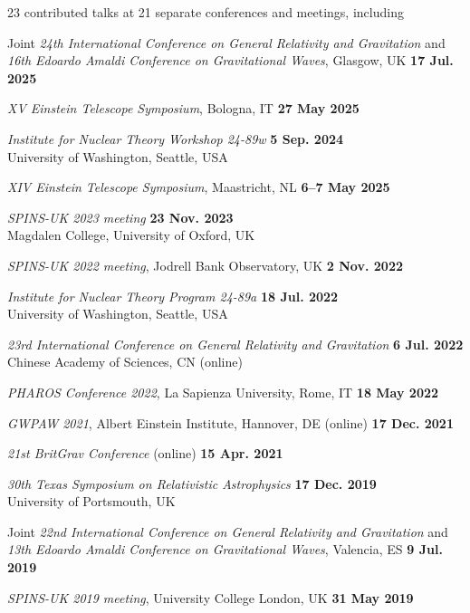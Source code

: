23 contributed talks at 21 separate conferences and meetings, including

\begin{etaremune}
    \item Joint \textit{24th International Conference on General Relativity and
    Gravitation} and
    \textit{16th Edoardo Amaldi Conference on Gravitational Waves}, Glasgow, UK
    \hfill \textbf{17 Jul. 2025}
    \item \textit{XV Einstein Telescope Symposium}, Bologna, IT
    \hfill \textbf{27 May 2025}
    \item \textit{Institute for Nuclear Theory Workshop 24-89w}
    \hfill \textbf{5 Sep. 2024} \\
    University of Washington, Seattle, USA
    \item \textit{XIV Einstein Telescope Symposium}, Maastricht, NL
    \hfill \textbf{6--7 May 2025}
    \item \textit{SPINS-UK 2023 meeting} \hfill \textbf{23 Nov. 2023} \\
    Magdalen College, University of Oxford, UK
    \item \textit{SPINS-UK 2022 meeting}, Jodrell Bank Observatory, UK
    \hfill \textbf{2 Nov. 2022}
    \item \textit{Institute for Nuclear Theory Program 24-89a}
    \hfill \textbf{18 Jul. 2022} \\
    University of Washington, Seattle, USA
    \item \textit{23rd International Conference on General Relativity and
    Gravitation} \hfill \textbf{6 Jul. 2022} \\
    Chinese Academy of Sciences, CN (online)
    \item \textit{PHAROS Conference 2022}, La Sapienza University, Rome, IT \hfill \textbf{18 May 2022}
    \item \textit{GWPAW 2021}, Albert Einstein Institute, Hannover, DE (online) \hfill \textbf{17 Dec. 2021}
    \item \textit{21st BritGrav Conference} (online)
    \hfill \textbf{15 Apr. 2021}
    \item \textit{30th Texas Symposium on Relativistic Astrophysics}
    \hfill \textbf{17 Dec. 2019} \\
    University of Portsmouth, UK
    \item Joint \textit{22nd International Conference on General Relativity and
    Gravitation} and
    \textit{13th Edoardo Amaldi Conference on Gravitational Waves},
    Valencia, ES \hfill \textbf{9 Jul. 2019}
    \item \textit{SPINS-UK 2019 meeting}, University College London, UK
    \hfill \textbf{31 May 2019}
\end{etaremune}


